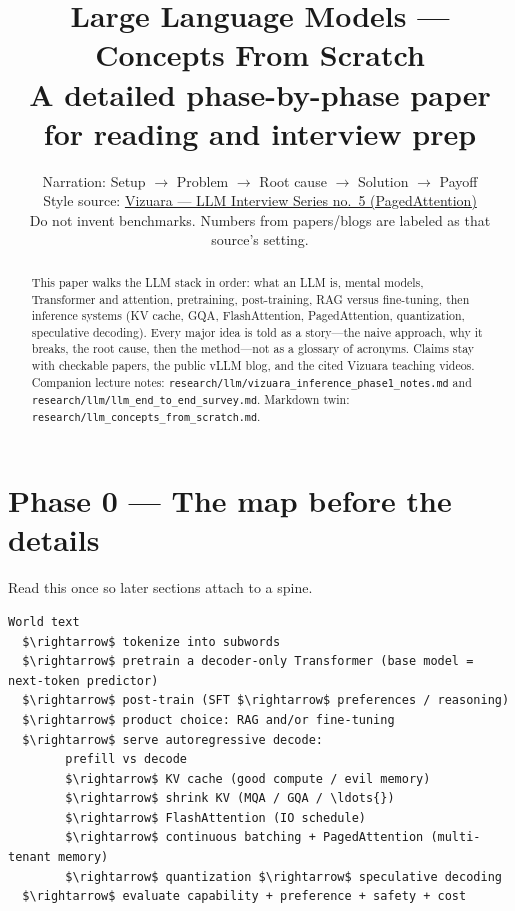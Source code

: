 \documentclass[11pt,a4paper]{article}
\title{Large Language Models --- Concepts From Scratch\\
\large A detailed phase-by-phase paper for reading and interview prep}
\author{Narration: Setup $\rightarrow$ Problem $\rightarrow$ Root cause $\rightarrow$ Solution $\rightarrow$ Payoff\\[0.4em]
Style source:
\href{https://www.youtube.com/watch?v=-AB6m0Spo6c}{Vizuara --- LLM Interview Series no.~5 (PagedAttention)}\\[0.4em]
Do not invent benchmarks. Numbers from papers/blogs are labeled as that source's setting.}
\date{}
\begin{document}
\maketitle

\begin{abstract}
This paper walks the LLM stack in order: what an LLM is, mental models, Transformer and attention, pretraining, post-training, RAG versus fine-tuning, then inference systems (KV cache, GQA, FlashAttention, PagedAttention, quantization, speculative decoding).
Every major idea is told as a story---the naive approach, why it breaks, the root cause, then the method---not as a glossary of acronyms.
Claims stay with checkable papers, the public vLLM blog, and the cited Vizuara teaching videos.
Companion lecture notes: \texttt{research/llm/vizuara\_inference\_phase1\_notes.md} and \texttt{research/llm/llm\_end\_to\_end\_survey.md}.
Markdown twin: \texttt{research/llm\_concepts\_from\_scratch.md}.
\end{abstract}

\tableofcontents
\clearpage

\clearpage
\section{Phase 0 --- The map before the details}


Read this once so later sections attach to a spine.


\begin{lstlisting}
World text
  $\rightarrow$ tokenize into subwords
  $\rightarrow$ pretrain a decoder-only Transformer (base model = next-token predictor)
  $\rightarrow$ post-train (SFT $\rightarrow$ preferences / reasoning)
  $\rightarrow$ product choice: RAG and/or fine-tuning
  $\rightarrow$ serve autoregressive decode:
        prefill vs decode
        $\rightarrow$ KV cache (good compute / evil memory)
        $\rightarrow$ shrink KV (MQA / GQA / \ldots{})
        $\rightarrow$ FlashAttention (IO schedule)
        $\rightarrow$ continuous batching + PagedAttention (multi-tenant memory)
        $\rightarrow$ quantization $\rightarrow$ speculative decoding
  $\rightarrow$ evaluate capability + preference + safety + cost
\end{lstlisting}
\end{document}
